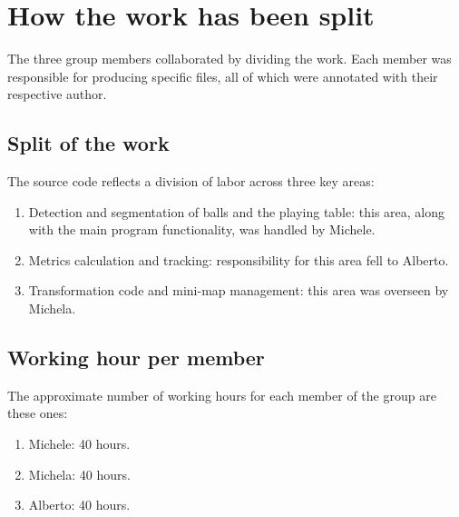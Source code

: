 \section{How the work has been split}
The three group members collaborated by dividing the work. Each member was responsible for producing specific files, all of which were annotated with their respective author.

\subsection{Split of the work}
The source code reflects a division of labor across three key areas:
\begin{enumerate}
	\item Detection and segmentation of balls and the playing table: this area, along with the main program functionality, was handled by Michele.
	\item Metrics calculation and tracking: responsibility for this area fell to Alberto.
	\item Transformation code and mini-map management: this area was overseen by Michela.
\end{enumerate}

\subsection{Working hour per member}
The approximate number of working hours for each member of the group are these ones:
\begin{enumerate}
	\item Michele: 40 hours.
	\item Michela: 40 hours.
	\item Alberto: 40 hours.
\end{enumerate}
